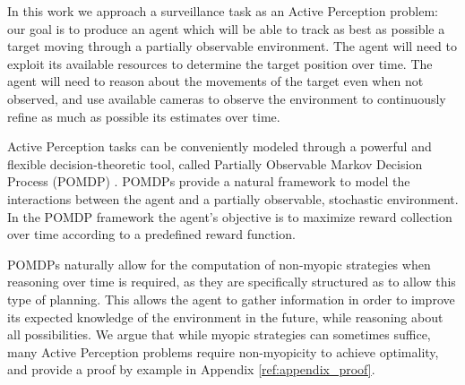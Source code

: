 
In this work we approach a surveillance task as an Active Perception problem: our goal is to produce
an agent which will be able to track as best as possible a target moving through a partially
observable environment. The agent will need to exploit its available resources to determine the
target position over time. The agent will need to reason about the movements of the target even when
not observed, and use available cameras to observe the environment to continuously refine as much as
possible its estimates over time.


Active Perception tasks can be conveniently modeled through a powerful and flexible
decision-theoretic tool, called Partially Observable Markov Decision Process (POMDP)
\cite{cit:pomdp}. POMDPs provide a natural framework to model the interactions between the agent and
a partially observable, stochastic environment.  In the POMDP framework the agent's objective is to
maximize reward collection over time according to a predefined reward function.

POMDPs naturally allow for the computation of non-myopic strategies when reasoning over time is
required, as they are specifically structured as to allow this type of planning. This allows the
agent to gather information in order to improve its expected knowledge of the environment in the
future, while reasoning about all possibilities. We argue that while myopic strategies can sometimes
suffice, many Active Perception problems require non-myopicity to achieve optimality, and provide a
proof by example in Appendix \ref{ref:appendix_proof}.

%


